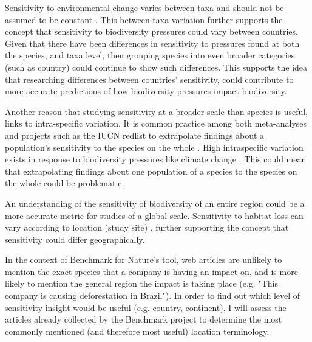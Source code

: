 \documentclass[11pt, a4paper, titlepage]{article}
\begin{document}
	Sensitivity to environmental change varies between taxa and should not be assumed to be constant \citep{sunday2015species}. This between-taxa variation further supports the concept that sensitivity to biodiversity pressures could vary between countries. Given that there have been differences in sensitivity to pressures found at both the species, and taxa level, then grouping species into even broader categories (such as country) could continue to show such differences. This supports the idea that researching differences between countries' sensitivity, could contribute to more accurate predictions of how biodiversity pressures impact biodiversity. \newline
   	 
	Another reason that studying sensitivity at a broader scale than species is useful, links to intra-specific variation. It is common practice among both meta-analyses and projects such as the IUCN redlist to extrapolate findings about a population's sensitivity to the species on the whole \citep{iucn2001iucn} \citep{buckley2012functional}. High intraspecific variation exists in response to biodiversity pressures like climate change \citep{mclean2018high} \citep{both2004large} \citep{mayor2016assessing}. This could mean that extrapolating findings about one population of a species to the species on the whole could be problematic. \newline

   	
   	An understanding of the sensitivity of biodiversity of an entire region could be a more accurate metric for studies of a global scale. Sensitivity to habitat loss can vary according to location (study site) \citep{mayor2016assessing}, further supporting the concept that sensitivity could differ geographically. \newline
   	
   	
   	 In the context of Benchmark for Nature's tool, web articles are unlikely to mention the exact species that a company is having an impact on, and is more likely to mention the general region the impact is taking place (e.g. "This company is causing deforestation in Brazil"). In order to find out which level of sensitivity insight would be useful (e.g. country, continent), I will assess the articles already collected by the Benchmark project to determine the most commonly mentioned (and therefore most useful) location terminology.  \newline
   	
\end{document}
